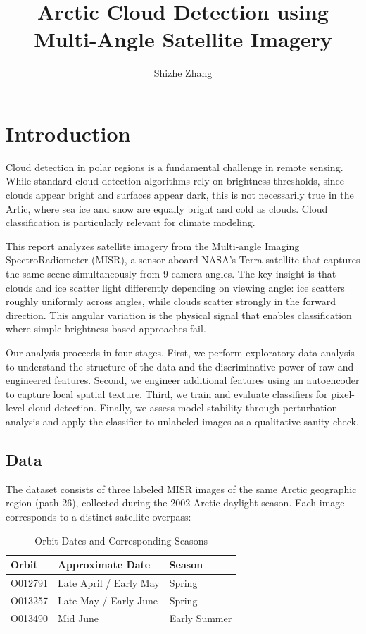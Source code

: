 \documentclass[10pt,letterpaper]{article}
\title{Arctic Cloud Detection using Multi-Angle Satellite Imagery\vspace{-2em}}
\author{Shizhe Zhang}
\date{}
\begin{document}
\maketitle

\section{Introduction}

Cloud detection in polar regions is a fundamental challenge in remote sensing. While standard cloud detection algorithms rely on brightness thresholds, since clouds appear bright and surfaces appear dark, this is not necessarily true in the Artic, where sea ice and snow are equally bright and cold as clouds. Cloud classification is particularly relevant for climate modeling. 

This report analyzes satellite imagery from the Multi-angle Imaging SpectroRadiometer (MISR), a sensor aboard NASA's Terra satellite that captures the same scene simultaneously from 9 camera angles. The key insight is that clouds and ice scatter light differently depending on viewing angle: ice scatters roughly uniformly across angles, while clouds scatter strongly in the forward direction. This angular variation is the physical signal that enables classification where simple brightness-based approaches fail.

Our analysis proceeds in four stages. First, we perform exploratory data analysis to understand the structure of the data and the discriminative power of raw and engineered features. Second, we engineer additional features using an autoencoder to capture local spatial texture. Third, we train and evaluate classifiers for pixel-level cloud detection. Finally, we assess model stability through perturbation analysis and apply the classifier to unlabeled images as a qualitative sanity check.

\subsection{Data}

The dataset consists of three labeled MISR images of the same Arctic geographic region (path 26), collected during the 2002 Arctic daylight season. Each image corresponds to a distinct satellite overpass:

\begin{table}[h!]
\centering
\begin{tabular}{lll}
\hline
\textbf{Orbit} & \textbf{Approximate Date} & \textbf{Season} \\
\hline
O012791 & Late April / Early May & Spring \\
O013257 & Late May / Early June & Spring \\
O013490 & Mid June & Early Summer \\
\hline
\end{tabular}
\caption{Orbit Dates and Corresponding Seasons}
\label{tab:orbit_seasons}
\end{table}
\end{document}
